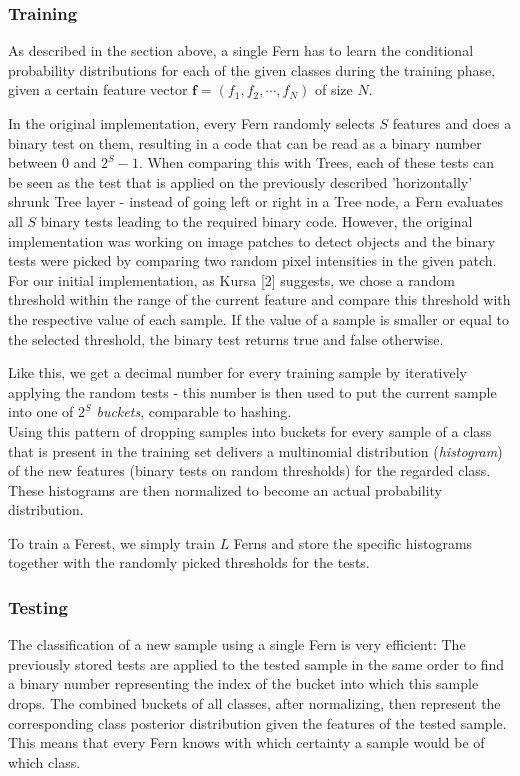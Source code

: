 \documentclass[twocolumn]{article}
\begin{document}
\subsubsection{Training}

As described in the section above, a single Fern has to learn the conditional probability distributions for each of the given classes during the training phase, given a certain feature vector $\mathbf{f} = (f_1,f_2, \cdots, f_N)$ of size $N$.

In the original implementation, every Fern randomly selects $S$ features and does a binary test on them, resulting in a code that can be read as a binary number between $0$ and $2^S-1$. When comparing this with Trees, each of these tests can be seen as the test that is applied on the previously described 'horizontally' shrunk Tree layer - instead of going left or right in a Tree node, a Fern evaluates all $S$ binary tests leading to the required binary code. However, the original implementation was working on image patches to detect objects and the binary tests were picked by comparing two random pixel intensities in the given patch. For our initial implementation, as Kursa [2] suggests, we chose a random threshold within the range of the current feature and compare this threshold with the respective value of each sample. If the value of a sample is smaller or equal to the selected threshold, the binary test returns true and false otherwise.

Like this, we get a decimal number for every training sample by iteratively applying the random tests - this number is then used to put the current sample into one of $2^S$ \textit{buckets}, comparable to hashing.\\
Using this pattern of dropping samples into buckets for every sample of a class that is present in the training set delivers a multinomial distribution (\textit{histogram}) of the new features (binary tests on random thresholds) for the regarded class. These histograms are then normalized to become an actual probability distribution.

To train a Ferest, we simply train $L$ Ferns and store the specific histograms together with the randomly picked thresholds for the tests.

\subsubsection{Testing}

The classification of a new sample using a single Fern is very efficient: The previously stored tests are applied to the tested sample in the same order to find a binary number representing the index of the bucket into which this sample drops. The combined buckets of all classes, after normalizing, then represent the corresponding class posterior distribution given the features of the tested sample. This means that every Fern knows with which certainty a sample would be of which class.
\end{document}
